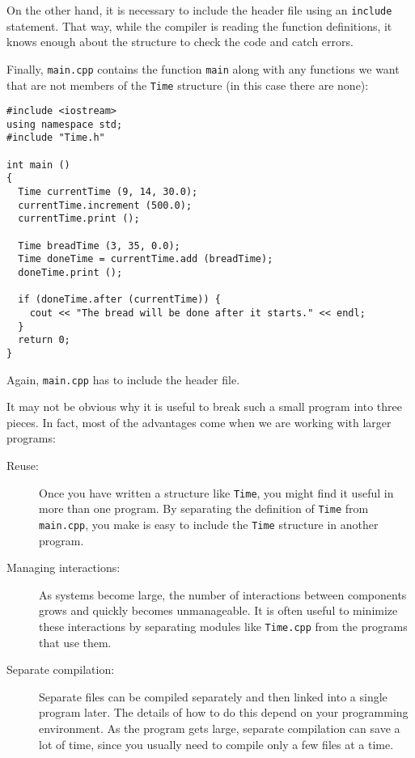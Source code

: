 On the other hand, it is necessary to include the header
file using an {\tt include} statement.  That way, while the
compiler is reading the function definitions, it knows enough
about the structure to check the code and catch errors.

Finally, {\tt main.cpp} contains the function {\tt main} along
with any functions we want that are not members of the {\tt Time}
structure (in this case there are none):

\begin{verbatim}
#include <iostream>
using namespace std;
#include "Time.h"

int main ()
{
  Time currentTime (9, 14, 30.0);
  currentTime.increment (500.0);
  currentTime.print ();

  Time breadTime (3, 35, 0.0);
  Time doneTime = currentTime.add (breadTime);
  doneTime.print ();

  if (doneTime.after (currentTime)) {
    cout << "The bread will be done after it starts." << endl;
  }
  return 0;
}

\end{verbatim}
%
Again, {\tt main.cpp} has to include the header file.

It may not be obvious why it is useful to break such a small
program into three pieces.  In fact, most of the advantages come
when we are working with larger programs:

\begin{description}

\item[Reuse:]  Once you have written a structure like {\tt Time},
you might find it useful in more than one program.  By separating
the definition of {\tt Time} from {\tt main.cpp}, you make is easy
to include the {\tt Time} structure in another program.

\item[Managing interactions:]  As systems become large, the number
of interactions between components grows and quickly becomes
unmanageable.  It is often useful to minimize these interactions
by separating modules like {\tt Time.cpp} from the programs that
use them.

\item[Separate compilation:]  Separate files can be compiled
separately and then linked into a single program later.  The details
of how to do this depend on your programming environment.  As
the program gets large, separate compilation can save a lot of time,
since you usually need to compile only a few files at a time.

\end{description}

